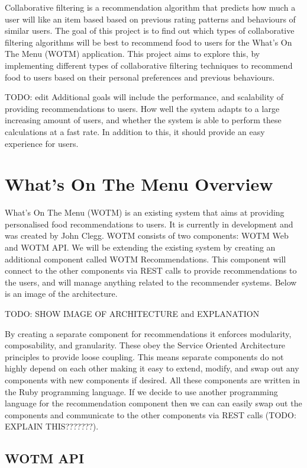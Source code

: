 Collaborative filtering is a recommendation algorithm that predicts how much a user will like an item based based on previous rating patterns and behaviours of similar users. The goal of this project is to find out which types of collaborative filtering algorithms will be best to recommend food to users for the What's On The Menu (WOTM) application. This project aims to explore this, by implementing different types of collaborative filtering techniques to recommend food to users based on their personal preferences and previous behaviours. 

TODO: edit
Additional goals will include the performance, and scalability of providing recommendations to users. How well the system adapts to a large increasing amount of users, and whether the system is able to perform these calculations at a fast rate. In addition to this, it should provide an easy experience for users.

\section{What's On The Menu Overview}

What's On The Menu (WOTM) is an existing system that aims at providing personalised food recommendations to users. It is currently in development and was created by John Clegg. WOTM consists of two components: WOTM Web and WOTM API. We will be extending the existing system by creating an additional component called WOTM Recommendations. This component will connect to the other components via REST calls to provide recommendations to the users, and will manage anything related to the recommender systems. Below is an image of the architecture. 

TODO: SHOW IMAGE OF ARCHITECTURE and EXPLANATION

By creating a separate component for recommendations it enforces modularity, composability, and granularity. These obey the Service Oriented Architecture principles to provide loose coupling. This means separate components do not highly depend on each other making it easy to extend, modify, and swap out any components with new components if desired. All these components are written in the Ruby programming language. If we decide to use another programming language for the recommendation component then we can can easily swap out the components and communicate to the other components via REST calls (TODO: EXPLAIN THIS???????). 


\subsection{WOTM API}

